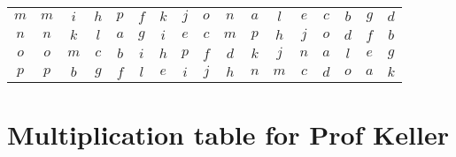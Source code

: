 \documentclass[12pt]{amsart}
\begin{document}
\begin{center}
\begin{tabular}{c|cccccccccccccccc}
	\(m\)  & \(m\)  & \(i\)  & \(h\)  & \(p\)  & \(f\)  & \(k\)  & \(j\)  & \(o\)  & \(n\)  & \(a\)  & \(l\)  & \(e\)  & \(c\)  & \(b\)  & \(g\)  & \(d\)  \\
	\(n\)  & \(n\)  & \(k\)  & \(l\)  & \(a\)  & \(g\)  & \(i\)  & \(e\)  & \(c\)  & \(m\)  & \(p\)  & \(h\)  & \(j\)  & \(o\)  & \(d\)  & \(f\)  & \(b\)  \\
	\(o\)  & \(o\)  & \(m\)  & \(c\)  & \(b\)  & \(i\)  & \(h\)  & \(p\)  & \(f\)  & \(d\)  & \(k\)  & \(j\)  & \(n\)  & \(a\)  & \(l\)  & \(e\)  & \(g\)  \\
	\(p\)  & \(p\)  & \(b\)  & \(g\)  & \(f\)  & \(l\)  & \(e\)  & \(i\)  & \(j\)  & \(h\)  & \(n\)  & \(m\)  & \(c\)  & \(d\)  & \(o\)  & \(a\)  & \(k\)  
\end{tabular}\end{center}\clearpage

\section*{Multiplication table for Prof Keller}
\end{document}
